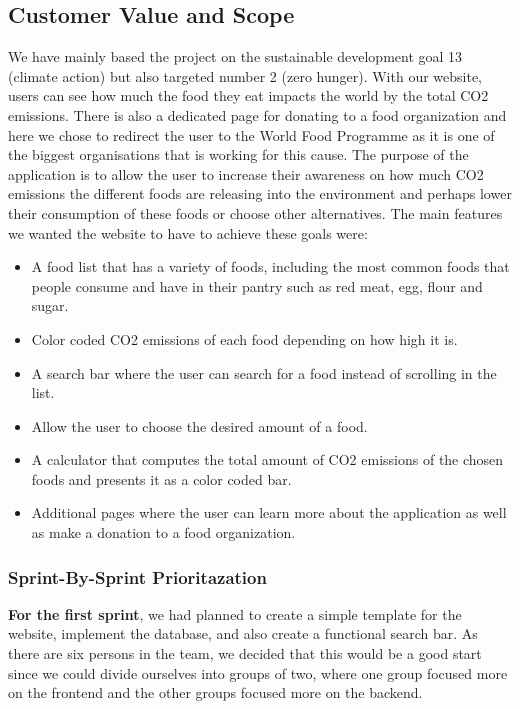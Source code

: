 \subsection{Customer Value and Scope}
We have mainly based the project on the sustainable development goal 13 (climate action) but also targeted number 2 (zero hunger)\cite{UN}. With our website, users can see how much the food they eat impacts the world by the total CO2 emissions. There is also a dedicated page for donating to a food organization and here we chose to redirect the user to the World Food Programme as it is one of the biggest organisations that is working for this cause. The purpose of the application is to allow the user to increase their awareness on how much CO2 emissions the different foods are releasing into the environment and perhaps lower their consumption of these foods or choose other alternatives.
The main features we wanted the website to have to achieve these goals were:
\begin{itemize}
\item A food list that has a variety of foods, including the most common foods that people consume and have in their pantry such as red meat, egg, flour and sugar. 
\item Color coded CO2 emissions of each food depending on how high it is. 
\item A search bar where the user can search for a food instead of scrolling in the list. 
\item Allow the user to choose the desired amount of a food.  
\item A calculator that computes the total amount of CO2 emissions of the chosen foods and presents it as a color coded bar. 
\item Additional pages where the user can learn more about the application as well as make a donation to a food organization.
\end{itemize}
\subsubsection{Sprint-By-Sprint Prioritazation}
\textbf{For the first sprint}, we had planned to create a simple template for the website, implement the database, and also create a functional search bar. As there are six persons in the team, we decided that this would be a good start since we could divide ourselves into groups of two, where one group focused more on the frontend and the other groups focused more on the backend. 

